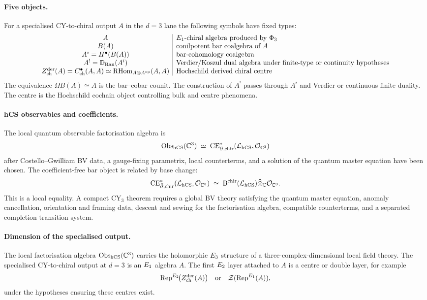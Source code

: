 \paragraph{Five objects.}
For a specialised CY-to-chiral output $A$ in the $d=3$ lane the
following symbols have fixed types:
\[
\begin{array}{c|l}
  A & E_1\text{-chiral algebra produced by }\Phi_3 \\
  B(A) & \text{conilpotent bar coalgebra of }A \\
  A^i=H^\bullet(B(A)) & \text{bar-cohomology coalgebra} \\
  A^!=\mathbb{D}_{\mathrm{Ran}}(A^i) &
    \text{Verdier/Koszul dual algebra under finite-type or continuity hypotheses} \\
  Z^{\mathrm{der}}_{\mathrm{ch}}(A)
    = C^\bullet_{\mathrm{ch}}(A,A)
    \simeq \mathrm{RHom}_{A\otimes A^{\mathrm{op}}}(A,A) &
    \text{Hochschild derived chiral centre}
\end{array}
\]
The equivalence $\Omega B(A)\simeq A$ is the bar--cobar counit.  The
construction of $A^!$ passes through $A^i$ and Verdier or continuous
finite duality.  The centre is the Hochschild cochain object controlling
bulk and centre phenomena.

\paragraph{hCS observables and coefficients.}
The local quantum observable factorisation algebra is
\[
  \mathrm{Obs}_{\mathrm{hCS}}(\mathbb{C}^3)
  \;\simeq\;
  \mathrm{CE}^*_{\bar\partial,\mathrm{chir}}(\mathcal{L}_{\mathrm{hCS}},\mathcal{O}_{\mathbb{C}^3})
\]
after Costello--Gwilliam BV data, a gauge-fixing parametrix, local
counterterms, and a solution of the quantum master equation have been
chosen.  The coefficient-free bar object is related by base change:
\[
  \mathrm{CE}^*_{\bar\partial,\mathrm{chir}}(\mathcal{L}_{\mathrm{hCS}},\mathcal{O}_{\mathbb{C}^3})
  \;\simeq\;
  \mathrm{B}^{\mathrm{chir}}(\mathcal{L}_{\mathrm{hCS}})\widehat{\otimes}_{\mathbb{C}}\mathcal{O}_{\mathbb{C}^3}.
\]
This is a local equality.  A compact CY$_3$ theorem requires a
global BV theory satisfying the quantum master equation, anomaly
cancellation, orientation and framing data, descent and sewing for
the factorisation algebra, compatible counterterms, and a separated
completion transition system.

\paragraph{Dimension of the specialised output.}
The local factorisation algebra $\mathrm{Obs}_{\mathrm{hCS}}(\mathbb{C}^3)$ carries the
holomorphic $E_3$ structure of a three-complex-dimensional local
field theory.  The specialised CY-to-chiral output at $d=3$ is an
$E_1$ algebra $A$.  The first $E_2$ layer attached to $A$ is a
centre or double layer, for example
\[
  \mathrm{Rep}^{E_2}\!\bigl(Z^{\mathrm{der}}_{\mathrm{ch}}(A)\bigr)
  \quad\text{or}\quad
  \mathcal Z(\mathrm{Rep}^{E_1}(A)),
\]
under the hypotheses ensuring these centres exist.

